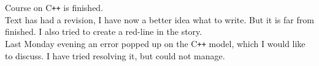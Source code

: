 Course on C\texttt{++} is finished. \\
Text has had a revision, I have now a better idea what to write. But it is far from finished. I also tried to create a red-line in the story. \\
Last Monday evening an error popped up on the  C\texttt{++} model, which I would like to discuss. I have tried resolving it, but could not manage.

